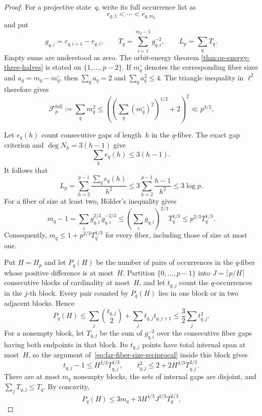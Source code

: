 \begin{proof}
For a projective state~$q$, write its full occurrence list as
\[
 r_{q,1}<\cdots<r_{q,m_q}
\]
and put
\[
 g_{q,i}=r_{q,i+1}-r_{q,i},\qquad
 T_q=\sum_{i=1}^{m_q-1}g_{q,i}^{-2},\qquad
 L_p=\sum_qT_q.
\]
Empty sums are understood as zero.  The orbit-energy theorem
\ref{thm:oe-energy-three-halves} is stated on
$\{1,\ldots,p-2\}$.  If $m_q^\circ$ denotes the corresponding fiber
sizes and $a_q=m_q-m_q^\circ$, then
$\sum_qa_q=2$ and $\sum_qa_q^2\le4$.  The triangle inequality in
$\ell^2$ therefore gives
\begin{equation}
 \mathcal F_p^{\mathrm{full}}
 :=\sum_qm_q^2
 \le\left(\left(\sum_q(m_q^\circ)^2\right)^{1/2}+2\right)^2
 \ll p^{3/2}.
\label{eq:far-full-fiber-energy}
\end{equation}

Let $e_q(h)$ count consecutive gaps of length~$h$ in the $q$-fiber.
The exact gap criterion and $\deg N_h=3(h-1)$ give
\[
 \sum_qe_q(h)\le3(h-1).
\]
It follows that
\begin{equation}
 L_p
 =\sum_{h=2}^{p-1}\frac{\sum_qe_q(h)}{h^2}
 \le3\sum_{h=2}^{p-1}\frac{h-1}{h^2}
 \le3\log p.
\label{eq:far-reciprocal-gap-budget}
\end{equation}
For a fiber of size at least two, H\"older's inequality gives
\begin{equation}
 m_q-1
 =\sum_i g_{q,i}^{2/3}g_{q,i}^{-2/3}
 \le\left(\sum_i g_{q,i}\right)^{2/3}T_q^{1/3}
 \le p^{2/3}T_q^{1/3}.
\label{eq:far-fiber-size-reciprocal}
\end{equation}
Consequently,
$m_q\le1+p^{2/3}T_q^{1/3}$ for every fiber, including those of size at
most one.

Put $H=H_p$ and let $P_q(H)$ be the number of pairs of occurrences in
the $q$-fiber whose positive difference is at most~$H$.  Partition
$\{0,\ldots,p-1\}$ into
$J=\lceil p/H\rceil$ consecutive blocks of cardinality at most~$H$, and
let $t_{q,j}$ count the $q$-occurrences in the $j$-th block.  Every pair
counted by $P_q(H)$ lies in one block or in two adjacent blocks.  Hence
\begin{equation}
 P_q(H)
 \le\sum_j\binom{t_{q,j}}2+\sum_jt_{q,j}t_{q,j+1}
 \le\frac32\sum_jt_{q,j}^2.
\label{eq:far-near-pair-blocks}
\end{equation}
For a nonempty block, let $T_{q,j}$ be the sum of $g_{q,i}^{-2}$ over
the consecutive fiber gaps having both endpoints in that block.  Its
$t_{q,j}$ points have total internal span at most~$H$, so the argument
of~\eqref{eq:far-fiber-size-reciprocal} inside this block gives
\[
 t_{q,j}-1\le H^{2/3}T_{q,j}^{1/3},\qquad
 t_{q,j}^2\le2+2H^{4/3}T_{q,j}^{2/3}.
\]
There are at most $m_q$ nonempty blocks, the sets of internal gaps are
disjoint, and $\sum_jT_{q,j}\le T_q$.  By concavity,
\begin{equation}
 P_q(H)
 \le3m_q+3H^{4/3}J^{1/3}T_q^{2/3}.
\label{eq:far-near-pair-reciprocal}
\end{equation}


\end{proof}
